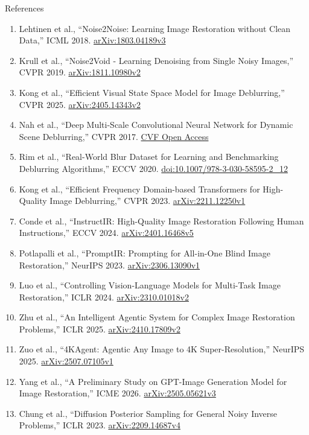 \begin{frame}[allowframebreaks=0.9]{References}
\begin{enumerate}
    \item Lehtinen et al., ``Noise2Noise: Learning Image Restoration without Clean Data,'' ICML 2018. \href{https://arxiv.org/abs/1803.04189v3}{arXiv:1803.04189v3}
    \item Krull et al., ``Noise2Void - Learning Denoising from Single Noisy Images,'' CVPR 2019. \href{https://arxiv.org/abs/1811.10980v2}{arXiv:1811.10980v2}
    \item Kong et al., ``Efficient Visual State Space Model for Image Deblurring,'' CVPR 2025. \href{https://arxiv.org/abs/2405.14343v2}{arXiv:2405.14343v2}
    \item Nah et al., ``Deep Multi-Scale Convolutional Neural Network for Dynamic Scene Deblurring,'' CVPR 2017. \href{https://openaccess.thecvf.com/content_cvpr_2017/html/Nah_Deep_Multi-Scale_Convolutional_CVPR_2017_paper.html}{CVF Open Access}
    \item Rim et al., ``Real-World Blur Dataset for Learning and Benchmarking Deblurring Algorithms,'' ECCV 2020. \href{https://doi.org/10.1007/978-3-030-58595-2_12}{doi:10.1007/978-3-030-58595-2\_12}
    \item Kong et al., ``Efficient Frequency Domain-based Transformers for High-Quality Image Deblurring,'' CVPR 2023. \href{https://arxiv.org/abs/2211.12250v1}{arXiv:2211.12250v1}
    \item Conde et al., ``InstructIR: High-Quality Image Restoration Following Human Instructions,'' ECCV 2024. \href{https://arxiv.org/abs/2401.16468v5}{arXiv:2401.16468v5}
    \item Potlapalli et al., ``PromptIR: Prompting for All-in-One Blind Image Restoration,'' NeurIPS 2023. \href{https://arxiv.org/abs/2306.13090v1}{arXiv:2306.13090v1}
    \item Luo et al., ``Controlling Vision-Language Models for Multi-Task Image Restoration,'' ICLR 2024. \href{https://arxiv.org/abs/2310.01018v2}{arXiv:2310.01018v2}
    \item Zhu et al., ``An Intelligent Agentic System for Complex Image Restoration Problems,'' ICLR 2025. \href{https://arxiv.org/abs/2410.17809v2}{arXiv:2410.17809v2}
    \item Zuo et al., ``4KAgent: Agentic Any Image to 4K Super-Resolution,'' NeurIPS 2025. \href{https://arxiv.org/abs/2507.07105v1}{arXiv:2507.07105v1}
    \item Yang et al., ``A Preliminary Study on GPT-Image Generation Model for Image Restoration,'' ICME 2026. \href{https://arxiv.org/abs/2505.05621v3}{arXiv:2505.05621v3}
    \item Chung et al., ``Diffusion Posterior Sampling for General Noisy Inverse Problems,'' ICLR 2023. \href{https://arxiv.org/abs/2209.14687v4}{arXiv:2209.14687v4}

\end{enumerate}
\end{frame}
